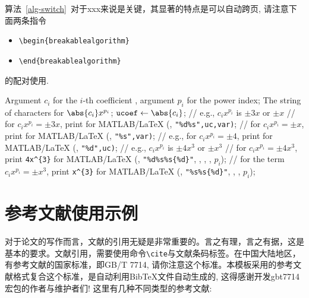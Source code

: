 算法~\ref{alg-switch}~对于xxx来说是关键，其显著的特点是可以自动跨页, 
请注意下面两条指令
\begin{itemize}
\item \lstinline|\begin{breakablealgorithm}|
\item \lstinline|\end{breakablealgorithm}|
\end{itemize}
的配对使用. 

\begin{breakablealgorithm}
\caption{Generate symbolic expression for the term $\abs{c_i}x^{p_i}$ without the sign of $c$} \label{alg-switch}
\begin{algorithmic}[1]
\Require Argument $c_i$ for the $i$-th coefficient , argument $p_i$ for the power index;
\Ensure The string of characters for $\abs{c_i}x^{p_i}$; 
\State $\cpvar{ucoef} \gets \abs{c_i}$;
  \quad // e.g.,  $c_ix^{p_i}$ is $\pm 3x$ or $\pm x$
    \quad // for $c_ix^{p_i}=\pm 3x$, print  for MATLAB/\LaTeX
      \State {}(, \lstinline|"%d%s",uc,var)|; 
   \Else \quad // for $c_ix^{p_i}=\pm x$, print  for MATLAB/\LaTeX
       \State {}(, \lstinline|"%s",var)|; 
   \EndIf
\EndCase
{} \quad // e.g., for $c_ix^{p_i}=\pm 4$, print  for MATLAB/\LaTeX
   \State {}(, \lstinline|"%d",uc)|;
\EndCase
\Default \quad // e.g.,  $c_ix^{p_i}$ is $\pm 4x^3$ or $\pm x^3$
    \quad // for $c_ix^{p_i}=\pm 4x^3$, print \lstinline|4x^{3}| for MATLAB/\LaTeX
      \State {}(, \lstinline|"%d%s%s{%d}"|, , , , $p_i$);
   \Else \quad // for the term  $c_ix^{p_i}=\pm x^3$, print \lstinline|x^{3}| for MATLAB/\LaTeX
       \State {}(, \lstinline|"%s%s{%d}"|, , , $p_i$);
   \EndIf
\EndDefault
\EndSwitch
\EndFunction
\end{algorithmic}
\end{breakablealgorithm}





\section{参考文献使用示例}

对于论文的写作而言，文献的引用无疑是非常重要的。言之有理，言之有据，这是基本的要求。文献引用，需要使用命令\lstinline|\cite|与文献条码标签。在中国大陆地区，有参考文献的国家标准，即GB/T 7714, 请你注意这个标准。本模板采用的参考文献格式复合这个标准，是自动利用BibTeX文件自动生成的, 这得感谢开发gbt7714宏包的作者与维护者们! 这里有几种不同类型的参考文献:

